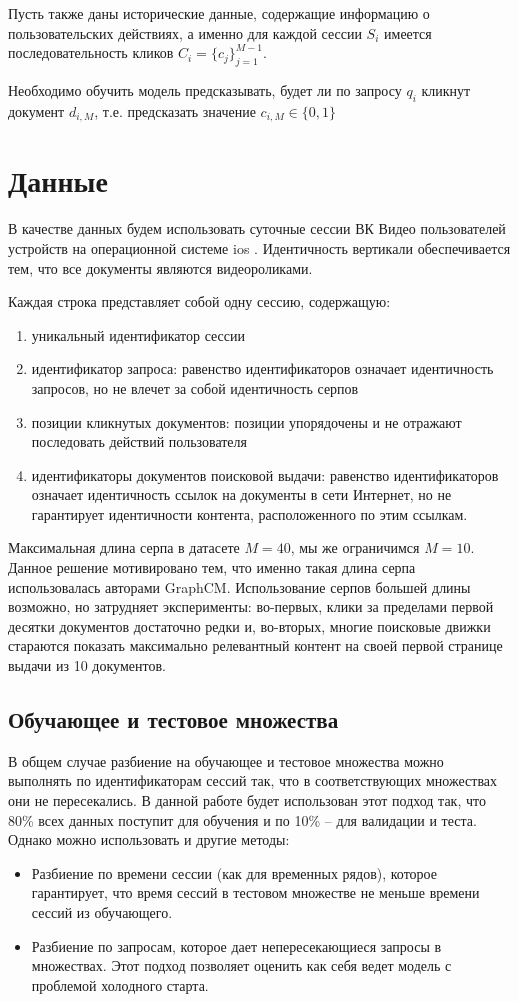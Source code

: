 \documentclass[diploma]{nanolab2015}
\begin{document}
Пусть также даны исторические данные, содержащие информацию о пользовательских действиях, а именно для каждой сессии $S_i$ имеется последовательность кликов $C_i = \{c_j\}_{j=1}^{M-1}$.

Необходимо обучить модель предсказывать, будет ли по запросу $q_i$ кликнут документ $d_{i,M}$, т.е. предсказать значение $c_{i,M} \in \{0, 1\}$
\section{Данные}
В качестве данных будем использовать суточные сессии ВК Видео пользователей устройств на операционной системе ios \cite{vkds}. Идентичность вертикали обеспечивается тем, что все документы являются видеороликами.

Каждая строка представляет собой одну сессию, содержащую:

\begin{enumerate}
    \item уникальный идентификатор сессии
    \item идентификатор запроса: равенство идентификаторов означает идентичность запросов, но не влечет за собой идентичность серпов
    \item позиции кликнутых документов: позиции упорядочены и не отражают последовать действий пользователя
    \item идентификаторы документов поисковой выдачи: равенство идентификаторов означает идентичность ссылок на документы в сети Интернет, но не гарантирует идентичности контента, расположенного по этим ссылкам.
\end{enumerate}

Максимальная длина серпа в датасете $M = 40$, мы же ограничимся $M = 10$. Данное решение мотивировано тем, что именно такая длина серпа использовалась авторами GraphCM. Использование серпов большей длины возможно, но затрудняет эксперименты: во-первых, клики за пределами первой десятки документов достаточно редки и, во-вторых, многие поисковые движки стараются показать максимально релевантный контент на своей первой странице выдачи из 10 документов.

\subsection{Обучающее и тестовое множества}
В общем случае разбиение на обучающее и тестовое множества можно выполнять по идентификаторам сессий так, что в соответствующих множествах они не пересекались. В данной работе будет использован этот подход так, что 80\% всех данных поступит для обучения и по 10\% -- для валидации и теста. Однако можно использовать и другие методы:
\begin{itemize}
    \item Разбиение по времени сессии (как для временных рядов), которое гарантирует, что время сессий в тестовом множестве не меньше времени сессий из обучающего.
    \item Разбиение по запросам, которое дает непересекающиеся запросы в множествах. Этот подход позволяет оценить как себя ведет модель с проблемой холодного старта.
\end{itemize}
\end{document}
